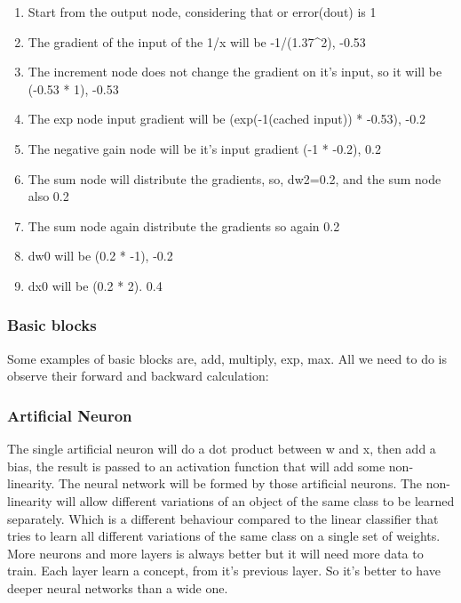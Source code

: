 \documentclass[11pt]{article}
\providecommand{\tightlist}{%
      \setlength{\itemsep}{0pt}\setlength{\parskip}{0pt}}
\begin{document}
\begin{enumerate}
\def\labelenumi{\arabic{enumi}.}
\tightlist
\item
  Start from the output node, considering that or error(dout) is 1
\item
  The gradient of the input of the 1/x will be -1/(1.37\^{}2), -0.53
\item
  The increment node does not change the gradient on it's input, so it
  will be (-0.53 * 1), -0.53
\item
  The exp node input gradient will be (exp(-1(cached input)) * -0.53),
  -0.2
\item
  The negative gain node will be it's input gradient (-1 * -0.2), 0.2
\item
  The sum node will distribute the gradients, so, dw2=0.2, and the sum
  node also 0.2
\item
  The sum node again distribute the gradients so again 0.2
\item
  dw0 will be (0.2 * -1), -0.2
\item
  dx0 will be (0.2 * 2). 0.4
\end{enumerate}

    \subsubsection{Basic blocks}\label{basic-blocks}

 Some examples of basic blocks are, add, multiply, exp, max. All we need
to do is observe their forward and backward calculation: 

    \subsubsection{Artificial Neuron}\label{artificial-neuron}

 The single artificial neuron will do a dot product between w and x,
then add a bias, the result is passed to an activation function that
will add some non-linearity. The neural network will be formed by those
artificial neurons. The non-linearity will allow different variations of
an object of the same class to be learned separately. Which is a
different behaviour compared to the linear classifier that tries to
learn all different variations of the same class on a single set of
weights. More neurons and more layers is always better but it will need
more data to train. Each layer learn a concept, from it's previous
layer. So it's better to have deeper neural networks than a wide one.
\end{document}
